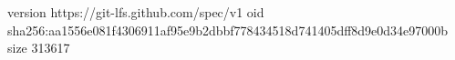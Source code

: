 version https://git-lfs.github.com/spec/v1
oid sha256:aa1556e081f4306911af95e9b2dbbf778434518d741405dff8d9e0d34e97000b
size 313617
